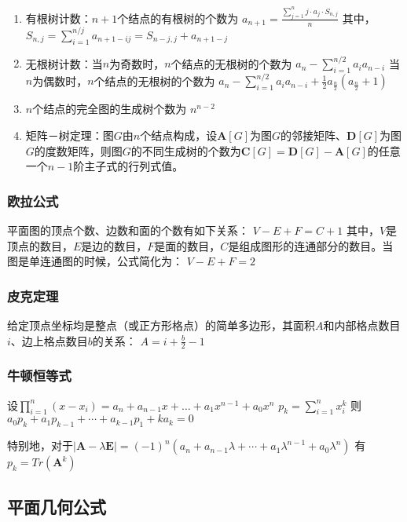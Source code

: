 \documentclass[landscape,twocolumn,a4paper]{article}
\begin{document}
	\begin{enumerate}
		\item 有根树计数：$n+1$个结点的有根树的个数为
		$a_{n+1} = \frac{\sum_{j=1}^{n}{j \cdot a_j \cdot{S_{n, j}}}}{n}$
		其中，
		$S_{n, j} = \sum_{i=1}^{n/j}{a_{n+1-ij}} = S_{n-j, j} + a_{n+1-j}$
		\item 无根树计数：当$n$为奇数时，$n$个结点的无根树的个数为
		$a_n-\sum_{i=1}^{n/2}{a_ia_{n-i}}$
		当$n$为偶数时，$n$个结点的无根树的个数为
		$a_n-\sum_{i=1}^{n/2}{a_ia_{n-i}}+\frac{1}{2}a_{\frac{n}{2}}(a_{\frac{n}{2}}+1)$
		\item $n$个结点的完全图的生成树个数为
		$n^{n-2}$
		\item 矩阵－树定理：图$G$由$n$个结点构成，设$\bm{A}[G]$为图$G$的邻接矩阵、$\bm{D}[G]$为图$G$的度数矩阵，则图$G$的不同生成树的个数为$\bm{C}[G] = \bm{D}[G] - \bm{A}[G]$的任意一个$n-1$阶主子式的行列式值。
	\end{enumerate}

	\subsubsection*{欧拉公式}

	平面图的顶点个数、边数和面的个数有如下关系：
	$V - E + F = C+ 1$
	\indent 其中，$V$是顶点的数目，$E$是边的数目，$F$是面的数目，$C$是组成图形的连通部分的数目。当图是单连通图的时候，公式简化为：
	$V - E + F = 2$

	\subsubsection*{皮克定理}

	给定顶点坐标均是整点（或正方形格点）的简单多边形，其面积$A$和内部格点数目$i$、边上格点数目$b$的关系：
	$A = i + \frac{b}{2} - 1$

	\subsubsection*{牛顿恒等式}

	设$\prod_{i = 1}^n{(x - x_i)} = a_n + a_{n - 1} x + \dots + a_1 x^{n - 1} + a_0 x^n$
	$p_k = \sum_{i = 1}^n{x_i^k}$
	则$a_0 p_k + a_1 p_{k - 1} + \cdots + a_{k - 1} p_1 + k a_k = 0$

	特别地，对于$|\bm{A} - \lambda \bm{E}| = (-1)^n(a_n + a_{n - 1} \lambda + \cdots + a_1 \lambda^{n - 1} + a_0 \lambda^n)$
	有$p_k = Tr(\bm{A}^k)$


	\subsection{平面几何公式}
\end{document}
